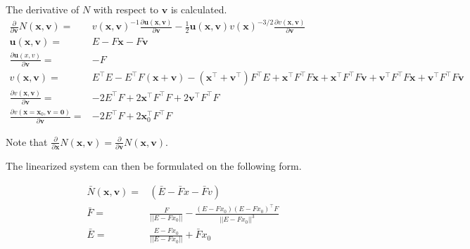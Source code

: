 The derivative of $N$ with respect to $\bm{v}$ is calculated.
\begin{align}
    \frac{\partial}{\partial \bm{v}} N(\bm{x},\bm{v}) ={} & v(\bm{x},\bm{v})^{-1} \frac{\partial \bm{u}(\bm{x},\bm{v})}{\partial \bm{v}}  - \frac{1}{2} \bm{u}(\bm{x},\bm{v}) v(\bm{x})^{-3/2} \frac{\partial v(\bm{x},\bm{v})}{\partial \bm{v}}\\
    \bm{u}(\bm{x},\bm{v}) ={} &  E - F \bm{x} - F \bm{v} \\
    \frac{\partial \bm{u}(x,v)}{\partial \bm{v}} ={} & -F \\
    v(\bm{x},\bm{v}) ={}  & E^\top E - E^\top F (\bm{x} +\bm{v}) - (\bm{x}^\top +\bm{v}^\top) F^\top E + \bm{x}^\top F^\top F \bm{x} 
    +\bm{x}^\top F^\top F \bm{v}
    +\bm{v}^\top F^\top F \bm{x}
    +\bm{v}^\top F^\top F \bm{v} \\
    \frac{\partial v(\bm{x},\bm{v})}{\partial \bm{v}} = {}&  -2 E^\top F + 2 \bm{x}^\top F^\top F +2 \bm{v}^\top F^\top F \\
    \frac{\partial v(\bm{x}=\bm{x}_0,\bm{v}=\bm{0})}{\partial \bm{v}} = {}&  -2 E^\top F + 2 \bm{x}_0^\top F^\top F
\end{align}

Note that $\frac{\partial}{\partial \bm{x}} N(\bm{x},\bm{v})= \frac{\partial}{\partial \bm{v}}N(\bm{x},\bm{v})$. 

The linearized system can then be formulated on the following form.


\begin{align}
        \bar{N}(\bm{x},\bm{v})  ={}& (\bar{E} - \bar{F} x -\bar{F} v) \\
        \bar{F} ={}& \frac{F}{||E - F  x_0||}
        -\frac{(E - F  x_0)(E - F x_0)^\top F}{||E - F x_0||^3}\\
        \bar{E} ={}&   \frac{E - F x_0}{||E - F x_0||} + \bar{F} x_0 \\
\end{align}